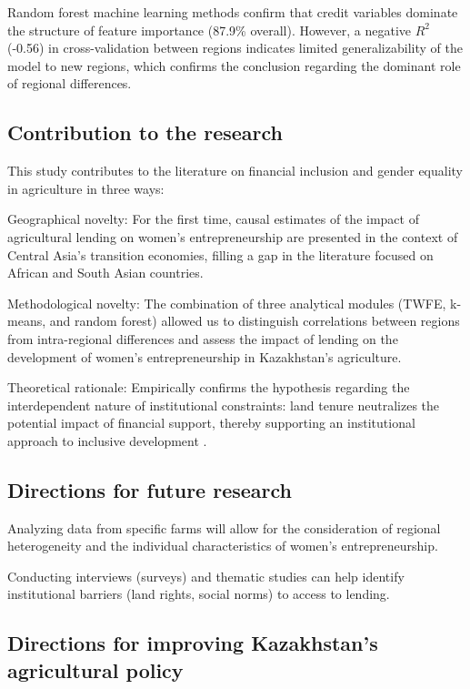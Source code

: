 \documentclass[pdflatex,sn-mathphys-ay]{sn-jnl}
\begin{document}
Random forest machine learning methods confirm that credit variables
dominate the structure of feature importance (87.9\% overall). However,
a negative $R^2$ (-0.56) in cross-validation between regions indicates
limited generalizability of the model to new regions, which confirms the
conclusion regarding the dominant role of regional differences.

\subsection{Contribution to the research}

This study contributes to the literature on financial inclusion and
gender equality in agriculture in three ways:

Geographical novelty: For the first time, causal estimates of the impact
of agricultural lending on women's entrepreneurship are presented in the
context of Central Asia's transition economies, filling a gap in the
literature focused on African and South Asian countries.

Methodological novelty: The combination of three analytical modules
(TWFE, k-means, and random forest) allowed us to distinguish
correlations between regions from intra-regional differences and assess
the impact of lending on the development of women's entrepreneurship in
Kazakhstan's agriculture.

Theoretical rationale: Empirically confirms the hypothesis regarding the
interdependent nature of institutional constraints: land tenure
neutralizes the potential impact of financial support, thereby
supporting an institutional approach to inclusive development
\citep{ref78,ref90}.

\subsection{Directions for future research}

Analyzing data from specific farms will allow for the consideration of
regional heterogeneity and the individual characteristics of women's
entrepreneurship.

Conducting interviews (surveys) and thematic studies can help identify
institutional barriers (land rights, social norms) to access to lending.

\subsection{Directions for improving Kazakhstan's agricultural policy}
\end{document}
